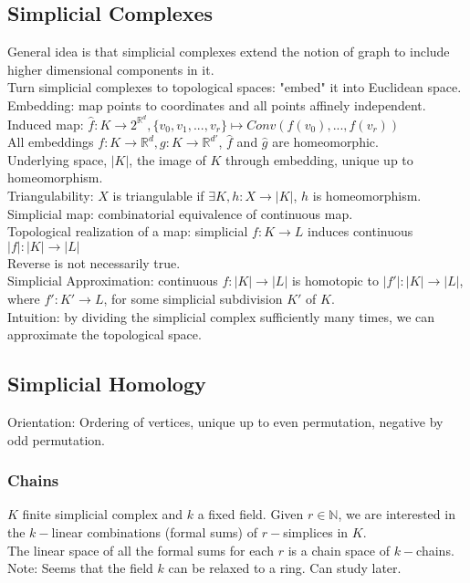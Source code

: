 \documentclass[10pt,a4paper]{article}
\begin{document}
\subsection{Simplicial Complexes}
General idea is that simplicial complexes extend the notion of graph to include higher dimensional components in it.\\
Turn simplicial complexes to topological spaces: "embed" it into Euclidean space.\\
Embedding: map points to coordinates and all points affinely independent.\\
Induced map: $\hat{f}:K\to 2^{\mathbb{R}^d},\{ v_0,v_1,...,v_r\}\mapsto Conv(f(v_0),...,f(v_r))$\\
All embeddings $f:K\to\mathbb{R}^d,g:K\to\mathbb{R}^{d'}$, $\hat{f}$ and $\hat{g}$ are homeomorphic.\\
Underlying space, $|K|$, the image of $K$ through embedding, unique up to homeomorphism.\\
Triangulability: $X$ is triangulable if $\exists K,h:X\to|K|$, $h$ is homeomorphism.\\
Simplicial map: combinatorial equivalence of continuous map.\\
Topological realization of a map: simplicial $f:K\to L$ induces continuous $|f|:|K|\to|L|$\\
Reverse is not necessarily true.\\
Simplicial Approximation: continuous $f:|K|\to|L|$ is homotopic to $|f'|:|K|\to|L|$, where $f':K'\to L$, for some simplicial subdivision $K'$ of $K$.\\
Intuition: by dividing the simplicial complex sufficiently many times, we can approximate the topological space.
\subsection{Simplicial Homology}
Orientation: Ordering of vertices, unique up to even permutation, negative by odd permutation.
\subsubsection{Chains}
$K$ finite simplicial complex and $k$ a fixed field. Given $r\in\mathbb{N}$, we are interested in the $k-$linear combinations (formal sums) of $r-$simplices in $K$.\\
The linear space of all the formal sums for each $r$ is a chain space of $k-$chains.\\
Note: Seems that the field $k$ can be relaxed to a ring. Can study later.
\end{document}
